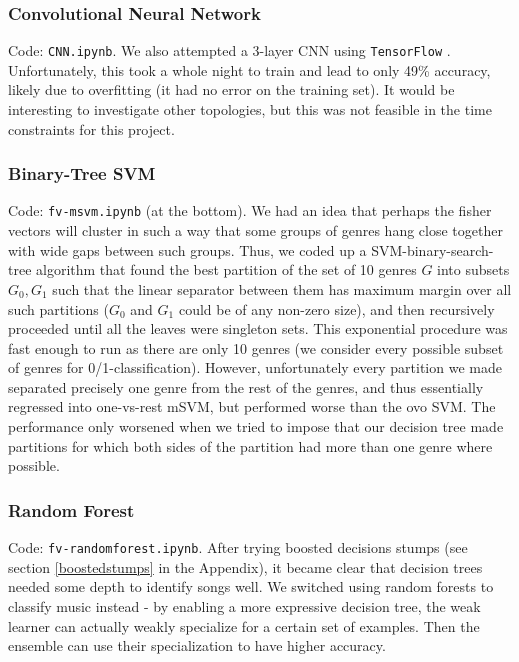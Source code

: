 \documentclass[9pt]{article}
\begin{document}
\subsubsection{Convolutional Neural Network}\label{cnn}

Code: \texttt{CNN.ipynb}. We also attempted a 3-layer CNN using \texttt{TensorFlow} \cite{tensorflow2015-whitepaper}. Unfortunately, this took a whole night to train and lead to only 49\% accuracy, likely due to overfitting (it had no error on the training set). It would be interesting to investigate other topologies, but this was not feasible in the time constraints for this project.

\subsubsection{Binary-Tree SVM}

Code: \texttt{fv-msvm.ipynb} (at the bottom).
We had an idea that perhaps the fisher vectors will cluster in such
a way that some groups of genres hang close together with wide
gaps between such groups.
Thus, we coded up a SVM-binary-search-tree algorithm that
found the best partition of the set of 10 genres $G$ into 
subsets $G_0, G_1$ such that the linear separator between them
has maximum margin over all such partitions ($G_0$ and $G_1$ could be
of any non-zero size), and then recursively proceeded until
all the leaves were singleton sets.
This exponential procedure was fast enough to run as there are only
10 genres (we consider every possible subset of genres for 0/1-classification).
However, unfortunately every partition we made separated precisely
one genre from the rest of the genres,
and thus essentially regressed into one-vs-rest mSVM, but performed worse than the ovo SVM.
The performance only worsened when we tried to impose
that our decision tree made partitions for which both sides of the 
partition had more than one genre where possible.


\subsubsection{Random Forest}\label{rf}

Code: \texttt{fv-randomforest.ipynb}. After trying boosted decisions stumps (see section \ref{boostedstumps} in the Appendix), it became clear that decision trees needed some depth to identify songs well. We switched using random forests to classify music instead - by enabling a more expressive decision tree, the weak learner can actually weakly specialize for a certain set of examples. Then the ensemble can use their specialization to have higher accuracy.
\end{document}
